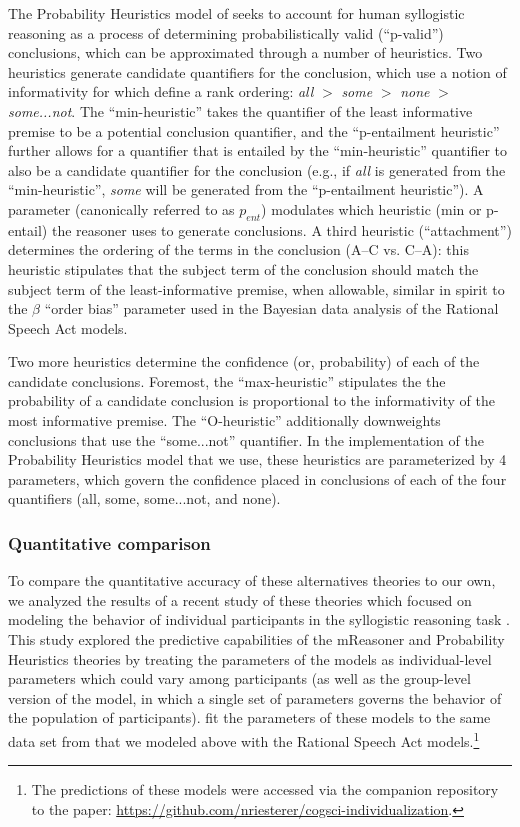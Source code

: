\documentclass[floatsintext, man]{apa6}
\begin{document}
The Probability Heuristics model of  seeks to account for human syllogistic reasoning as a process of determining probabilistically valid (``p-valid'') conclusions, which can be approximated through a number of heuristics. 
Two heuristics generate candidate quantifiers for the conclusion, which use a notion of informativity for which  define a rank ordering: \emph{all} $>$ \emph{some} $>$ \emph{none} $>$ \emph{some...not}.  
The ``min-heuristic'' takes the quantifier of the least informative premise to be a potential conclusion quantifier, and the ``p-entailment heuristic'' further allows for a quantifier that is entailed by the ``min-heuristic'' quantifier to also be a candidate quantifier for the conclusion (e.g., if \emph{all} is generated from the ``min-heuristic'', \emph{some} will be generated from the ``p-entailment heuristic''). 
A parameter (canonically referred to as $p_{ent}$) modulates which heuristic (min or p-entail) the reasoner uses to generate conclusions. 
A third heuristic (``attachment'') determines the ordering of the terms in the conclusion (A--C vs. C--A): this heuristic stipulates that the subject term of the conclusion should match the subject term of the least-informative premise, when allowable, similar in spirit to the $\beta$ ``order bias'' parameter used in the Bayesian data analysis of the Rational Speech Act models. 

Two more heuristics determine the confidence (or, probability) of each of the candidate conclusions. 
Foremost, the ``max-heuristic'' stipulates the the probability of a candidate conclusion is proportional to the informativity of the most informative premise.
The ``O-heuristic'' additionally downweights conclusions that use the ``some...not'' quantifier.
In the implementation of the Probability Heuristics model that we use, these heuristics are parameterized by 4 parameters, which govern the confidence placed in conclusions of each of the four quantifiers (all, some, some...not, and none).

\subsubsection{Quantitative comparison}

To compare the quantitative accuracy of these alternatives theories to our own, we analyzed the results of a recent study of these theories which focused on modeling the behavior of individual participants in the syllogistic reasoning task \cite{riesterer2020models}.
This study explored the predictive capabilities of the mReasoner and Probability Heuristics theories by treating the parameters of the models as individual-level parameters which could vary among participants (as well as the group-level version of the model, in which a single set of parameters governs the behavior of the population of participants).
 fit the parameters of these models to the same data set from  that we modeled above with the Rational Speech Act models.\footnote{The predictions of these models were accessed via the companion repository to the paper: \url{https://github.com/nriesterer/cogsci-individualization}.}
\end{document}
